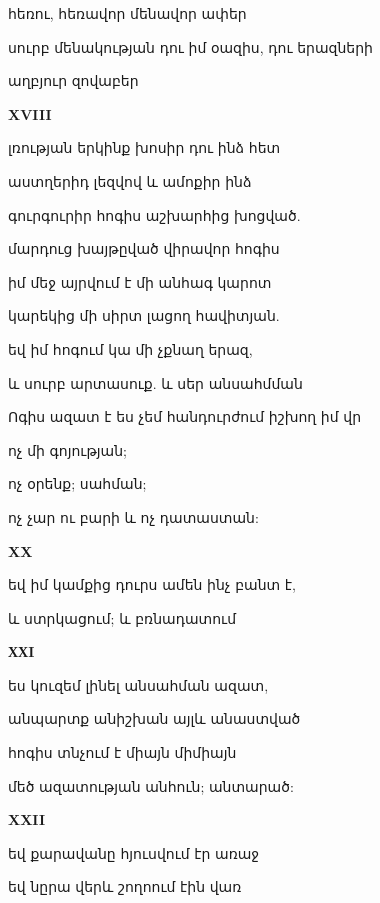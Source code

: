 հեռու, հեռավոր  մենավոր   ափեր


սուրբ մենակության դու իմ օազիս,  դու երազների 



աղբյուր  զովաբեր


\centerline {\bf    XVIII}

լռության երկինք խոսիր դու ինձ հետ


աստղերիդ լեզվով և ամոքիր ինձ


գուրգուրիր  հոգիս աշխարհից խոցված.

մարդուց խայթըված վիրավոր  հոգիս







իմ մեջ այրվում է մի անհագ  կարոտ



կարեկից մի սիրտ  լացող հավիտյան.

եվ իմ  հոգում  կա մի չքնաղ  երազ, 

և սուրբ արտասուք. և սեր անսահմման

  Ոգիս  ազատ է ես  չեմ հանդուրժում իշխող իմ վր

ոչ  մի գոյության;  



ոչ օրենք;  սահման; 



ոչ չար   ու բարի և ոչ դատաստան: 
         

 
\centerline{\bf XX}

եվ  իմ կամքից դուրս ամեն ինչ բանտ է,



և ստրկացում;  և   բռնադատում






\centerline {\bf      ХХI}
ես կուզեմ լինել անսահման ազատ,



անպարտք  անիշխան այլև անաստված



հոգիս տնչում է միայն  միմիայն 



մեծ ազատության անհուն; անտարած: 




\centerline {\bf  XXII}


եվ քարավանը  հյուսվում էր առաջ



եվ նըրա վերև շողոում     էին վառ


